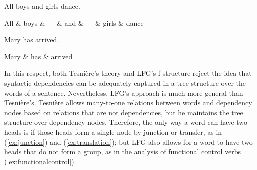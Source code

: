\documentclass[output=paper,hidelinks]{langscibook}
\begin{document}
\begin{exe}
  \ex\label{ex:dance}
  \begin{xlist}
  \ex
  All boys and girls dance.
  \ex{}
    \ex\label{ex:junction}
    \begin{dependency}[baseline=-0.6ex,theme=simple]
      \begin{deptext}
        All \& boys \& --- \& and \& --- \& girls \& dance \\
      \end{deptext}
    \end{dependency}
  \end{xlist}
\end{exe}


\begin{exe}
  \ex\label{ex:maryhasarrived}
  \begin{xlist}
    \ex
    Mary has arrived.
    \ex{}
    \ex\label{ex:translation}
    \begin{dependency}[baseline=-0.6ex,theme=simple]
      \begin{deptext}
        Mary \& has \& arrived \\
      \end{deptext}
    \end{dependency}
    \end{xlist}
\end{exe}
In this respect, both Tesnière's theory and LFG's f-structure reject
the idea that syntactic dependencies can be adequately captured in a
tree structure over the words of a sentence. Nevertheless, LFG's
approach is much more general than Tesnière's. Tesnière allows
many-to-one relations between words and dependency nodes based on
relations that are not dependencies, but he maintains the tree
structure over dependency nodes. Therefore, the only way a word can
have two heads is if those heads form a single node by junction or
transfer, as in (\ref{ex:junction}) and (\ref{ex:translation}); but
LFG also allows for a word to have two heads that do not form a group,
as in the analysis of functional control verbs (\ref{ex:functionalcontrol}).
\end{document}
